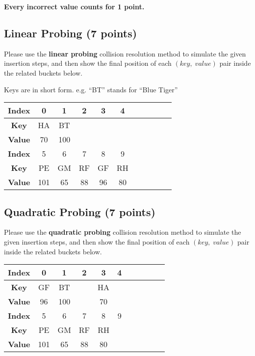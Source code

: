 \documentclass[11pt]{exam}
\begin{document}
\textbf{Every incorrect value counts for 1 point.}
\subsection{Linear Probing (7 points)}
Please use the \textbf{linear probing} collision resolution method to simulate the given insertion steps, and then show the final position of each $(key,\;value)$ pair inside the related buckets below.
\begin{solution} Keys are in short form. e.g. ``BT'' stands for ``Blue Tiger''
\begin{table}[H]
\centering
\renewcommand{\arraystretch}{2}
\setlength{\tabcolsep}{11mm}
\begin{tabular}{|c|c|c|c|c|c|c|c|c|c|c|}
\hline
\textbf{Index}&0&1&2&3&4\\
\hline
\textbf{Key}&HA&BT&&&\\
\hline
\textbf{Value}&70&100&&&\\
\hline
\textbf{Index}&5&6&7&8&9\\
\hline
\textbf{Key}&PE&GM&RF&GF&RH\\
\hline
\textbf{Value}&101&65&88&96&80\\
\hline
\end{tabular}
\end{table}
\end{solution}

\subsection{Quadratic Probing (7 points)}
Please use the \textbf{quadratic probing} collision resolution method to simulate the given insertion steps, and then show the final position of each $(key,\;value)$ pair inside the related buckets below.
\begin{solution}
\begin{table}[H]
\centering
\renewcommand{\arraystretch}{2}
\setlength{\tabcolsep}{11mm}
\begin{tabular}{|c|c|c|c|c|c|c|c|c|c|c|}
\hline
\textbf{Index}&0&1&2&3&4\\
\hline
\textbf{Key}&GF&BT&&HA&\\
\hline
\textbf{Value}&96&100&&70&\\
\hline
\textbf{Index}&5&6&7&8&9\\
\hline
\textbf{Key}&PE&GM&RF&RH&\\
\hline
\textbf{Value}&101&65&88&80&\\
\hline
\end{tabular}
\end{table}
\end{solution}
\end{document}
